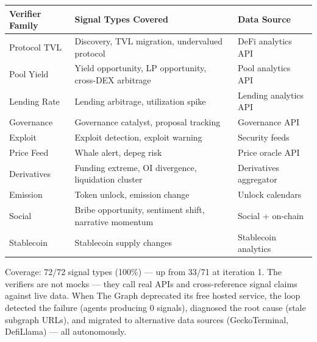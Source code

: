 \documentclass[11pt,a4paper]{article}
\newcounter{none} %
\begin{document}
{\def\LTcaptype{none} %
\begin{longtable}[]{@{}
  >{\raggedright\arraybackslash}p{}
  >{\raggedright\arraybackslash}p{}
  >{\raggedright\arraybackslash}p{}@{}}
\toprule\noalign{}
\begin{minipage}[b]{\linewidth}\raggedright
Verifier Family
\end{minipage} & \begin{minipage}[b]{\linewidth}\raggedright
Signal Types Covered
\end{minipage} & \begin{minipage}[b]{\linewidth}\raggedright
Data Source
\end{minipage} \\
\midrule\noalign{}
\endhead
\bottomrule\noalign{}
\endlastfoot
Protocol TVL & Discovery, TVL migration, undervalued protocol & DeFi analytics API \\
Pool Yield & Yield opportunity, LP opportunity, cross-DEX arbitrage & Pool analytics API \\
Lending Rate & Lending arbitrage, utilization spike & Lending analytics API \\
Governance & Governance catalyst, proposal tracking & Governance API \\
Exploit & Exploit detection, exploit warning & Security feeds \\
Price Feed & Whale alert, depeg risk & Price oracle API \\
Derivatives & Funding extreme, OI divergence, liquidation cluster & Derivatives aggregator \\
Emission & Token unlock, emission change & Unlock calendars \\
Social & Bribe opportunity, sentiment shift, narrative momentum & Social + on-chain \\
Stablecoin & Stablecoin supply changes & Stablecoin analytics \\
\end{longtable}
}

Coverage: 72/72 signal types (100\%) --- up from 33/71 at iteration 1. The verifiers are not mocks --- they call real APIs and cross-reference signal claims against live data. When The Graph deprecated its free hosted service, the loop detected the failure (agents producing 0 signals), diagnosed the root cause (stale subgraph URLs), and migrated to alternative data sources (GeckoTerminal, DefiLlama) --- all autonomously.
\end{document}
